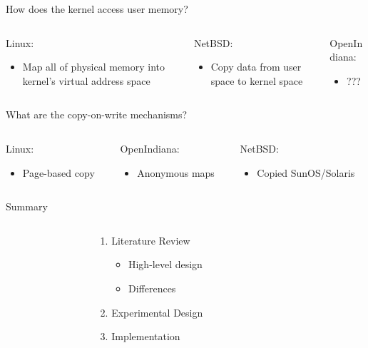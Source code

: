 \documentclass[aspectratio=169]{beamer}
\newcommand{\bi}{\begin{itemize}}
\newcommand{\ei}{\end{itemize}}
\newcommand{\bn}{\begin{enumerate}}
\newcommand{\en}{\end{enumerate}}
\begin{document}
\begin{frame}{How does the kernel access user memory?}
  \begin{columns}[T]
    \begin{column}{0.3\textwidth}
      Linux:
      \bi
    \item Map all of physical memory into kernel's virtual address space
      \ei
    \end{column}
    \pause
    \begin{column}{0.4\textwidth}
      NetBSD:
      \bi
    \item Copy data from user space to kernel space
      \ei
    \end{column}
    \pause
    \begin{column}{0.3\textwidth}
      OpenIndiana:
      \bi
    \item ???
      \ei
    \end{column}
  \end{columns}
\end{frame}

\begin{frame}{What are the copy-on-write mechanisms?}
  \begin{columns}[T]
    \begin{column}{0.3\textwidth}
      Linux:
      \bi
    \item Page-based copy
      \ei
    \end{column}
    \pause
    \begin{column}{0.3\textwidth}
      OpenIndiana:
      \bi
    \item Anonymous maps
      \ei
    \end{column}
    \pause
    \begin{column}{0.4\textwidth}
      NetBSD:
      \bi
    \item Copied SunOS/Solaris
      \ei
    \end{column}
  \end{columns}
\end{frame}

\begin{frame}{Summary}
  \begin{columns}[T]
    \begin{column}{0.2\textwidth}
    \end{column}
    \begin{column}{0.6\textwidth}
      \bn
    \item Literature Review
      \bi
    \item High-level design
    \item Differences
      \ei
    \item Experimental Design
    \item Implementation
      \en
    \end{column}
    \begin{column}{0.2\textwidth}
    \end{column}
  \end{columns}
\end{frame}
\end{document}
